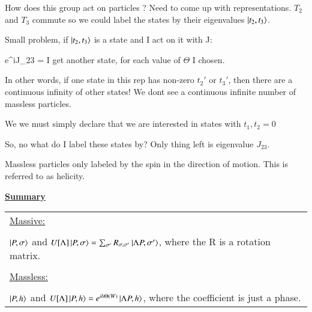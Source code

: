 {How does this group act on particles ?
Need to come up with representations.  $T_2$ and $T_3$ commute so we could label the states by their eigenvalues $\ket{t_2,t_3}$.

Small problem, if $\ket{t_2,t_3}$ is a state and I act on it with J:

\be
e^{i\Theta J_23}  =  
\ee
I get another state, for each value of $\Theta$ I chosen.

In other words, if one state in this rep has non-zero $t_2'$ or $t_3'$, then there are a continuous infinity of other states!
We dont see a continuous infinite number of massless particles. 

We we must simply declare that we are interested in states with $t_1, t_2 = 0$

So, no what do I label these states by?
Only thing left is eigenvalue $J_{23}$.

Massless particles only labeled by the spin in the direction of motion. 
This is referred to as helicity. 

{\Large \underline{\textbf{Summary}}}

\begin{tabular}{l}
\underline{Massive:}\\
\\
\hspace{0.5in}$\ket{P, \sigma}$ and $U[\Lambda] \ket{P, \sigma} = \sum_{\sigma'} R_{\sigma,\sigma'} \ket{\Lambda P, \sigma'}$, where the R is a rotation matrix.\\
\\
\underline{Massless:}\\
\\
\hspace{0.5in}$\ket{P, h}$ and $U[\Lambda] \ket{P, h} = e^{ih\Theta(W)}\ket{\Lambda P, h}$, where the coefficient is just a phase.\\
\end{tabular}

}



